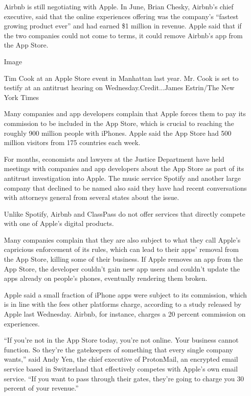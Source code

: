 Airbnb is still negotiating with Apple. In June, Brian Chesky, Airbnb's
chief executive, said that the online experiences offering was the
company's ``fastest growing product ever'' and had earned \$1 million in
revenue. Apple said that if the two companies could not come to terms,
it could remove Airbnb's app from the App Store.

Image

Tim Cook at an Apple Store event in Manhattan last year. Mr. Cook is set
to testify at an antitrust hearing on Wednesday.Credit...James
Estrin/The New York Times

Many companies and app developers complain that Apple forces them to pay
its commission to be included in the App Store, which is crucial to
reaching the roughly 900 million people with iPhones. Apple said the App
Store had 500 million visitors from 175 countries each week.

For months, economists and lawyers at the Justice Department have held
meetings with companies and app developers about the App Store as part
of its antitrust investigation into Apple. The music service Spotify and
another large company that declined to be named also said they have had
recent conversations with attorneys general from several states about
the issue.

Unlike Spotify, Airbnb and ClassPass do not offer services that directly
compete with one of Apple's digital products.

Many companies complain that they are also subject to what they call
Apple's capricious enforcement of its rules, which can lead to their
apps' removal from the App Store, killing some of their business. If
Apple removes an app from the App Store, the developer couldn't gain new
app users and couldn't update the apps already on people's phones,
eventually rendering them broken.

Apple said a small fraction of iPhone apps were subject to its
commission, which is in line with the fees other platforms charge,
according to a study released by Apple last Wednesday. Airbnb, for
instance, charges a 20 percent commission on experiences.

``If you're not in the App Store today, you're not online. Your business
cannot function. So they're the gatekeepers of something that every
single company wants,'' said Andy Yen, the chief executive of
ProtonMail, an encrypted email service based in Switzerland that
effectively competes with Apple's own email service. ``If you want to
pass through their gates, they're going to charge you 30 percent of your
revenue.''

